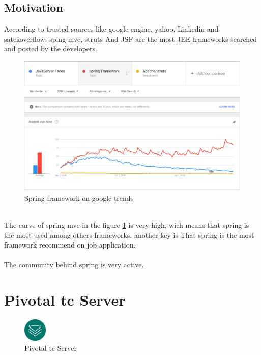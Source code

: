 \documentclass[12pt]{article}
\begin{document}
\subsection{Motivation}
According to trusted sources like google engine, yahoo, Linkedin and satckoverflow: sping mvc, struts And JSF are the most JEE frameworks searched and posted by the developers.\\
\begin{figure}[h]

	\centering
	\includegraphics[width=1.0\textwidth]{SpringMVC_statics_google_trends.png}
	\caption{Spring framework on google trends}
	\label{SpringMVC_statics_google_trends}
\end{figure}
\\
The curve of spring mvc in the figure \ref{SpringMVC_statics_google_trends} is very high, wich means that spring is the most used among others frameworks, another key is That spring is the most framework recommend on job application.
\\
\\
The community behind spring is very active.

\clearpage
\newpage

\section{Pivotal tc Server}

\begin{figure}[h]
	
	\centering
	\includegraphics[width=0.1\textwidth]{icon_tcserver.png}
	\caption{Pivotal tc Server}
	\label{Pivotal tc Server}
\end{figure}
\end{document}
